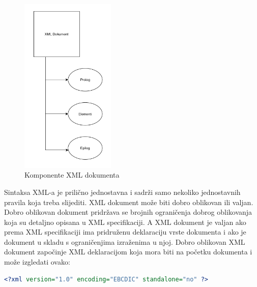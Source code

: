 \documentclass{foi}
\begin{document}
\begin{figure}[h!]
    \centering
    \includegraphics[width=0.4\textwidth]{slike/XMLkomponente.png}
    \caption{Komponente XML dokumenta}
\end{figure}

Sintaksa XML-a je prilično jednostavna i sadrži samo nekoliko jednostavnih pravila koja treba slijediti. XML dokument može biti dobro oblikovan ili valjan. Dobro oblikovan dokument pridržava se brojnih ograničenja dobrog oblikovanja koja su detaljno opisana u XML specifikaciji. A XML dokument je valjan ako prema XML specifikaciji ima pridruženu deklaraciju vrste dokumenta i ako je dokument u skladu s ograničenjima izraženima u njoj. Dobro oblikovan XML dokument započinje XML deklaracijom koja mora biti na početku dokumenta i može izgledati ovako:

\begin{lstlisting}[language=XML]
<?xml version="1.0" encoding="EBCDIC" standalone="no" ?>
\end{lstlisting}
\end{document}
